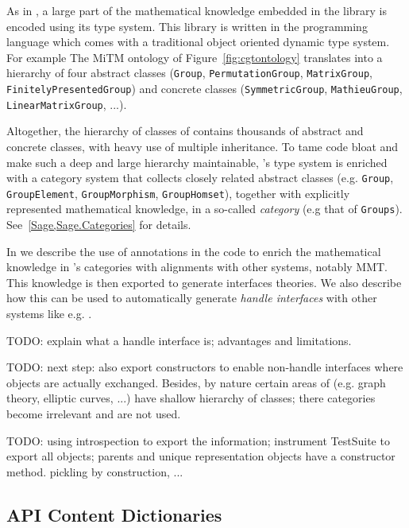 As in \GAP, a large part of the mathematical knowledge embedded in the
\Sage library is encoded using its type system. This library is
written in the \Python programming language which comes with a
traditional object oriented dynamic type system.
For example The MiTM ontology of Figure~\ref{fig:cgtontology}
translates into a hierarchy of four abstract classes (\texttt{Group},
\texttt{PermutationGroup}, \texttt{MatrixGroup},
\texttt{FinitelyPresentedGroup}) and concrete classes
(\texttt{SymmetricGroup}, \texttt{MathieuGroup},
\texttt{LinearMatrixGroup}, ...).

Altogether, the hierarchy of classes of \Sage contains thousands of
abstract and concrete classes, with heavy use of multiple inheritance.
To tame code bloat and make such a deep and large hierarchy
maintainable, \Python's type system is enriched with a category system
that collects closely related abstract classes (e.g. \texttt{Group},
\texttt{GroupElement}, \texttt{GroupMorphism}, \texttt{GroupHomset}),
together with explicitly represented mathematical knowledge, in a
so-called \emph{category} (e.g that of \texttt{Groups}).
See~\ref{Sage,Sage.Categories} for details.

In \cite{DehKohKon:iop16} we describe the use of annotations in the
code to enrich the mathematical knowledge in \Sage's categories with
alignments with other systems, notably MMT. This knowledge is then
exported to generate interfaces theories. We also describe how this
can be used to automatically generate \emph{handle interfaces} with
other systems like e.g. \GAP.

TODO: explain what a handle interface is; advantages and limitations.

TODO: next step: also export constructors to enable non-handle
interfaces where objects are actually exchanged. Besides, by nature
certain areas of \Sage (e.g. graph theory, elliptic curves, ...) have
shallow hierarchy of classes; there categories become irrelevant and
are not used. 

TODO: using introspection to export the information; instrument
TestSuite to export all objects; parents and unique representation
objects have a constructor method. pickling by construction, ...

\subsection{\Singular API Content Dictionaries}

